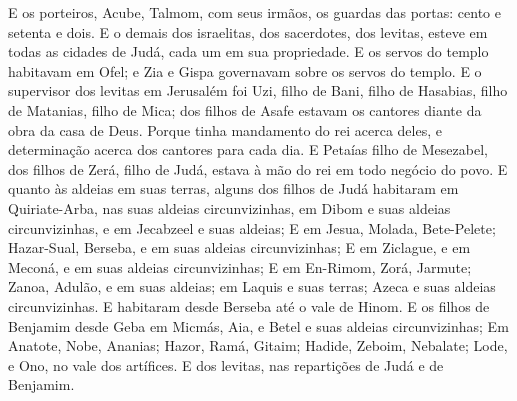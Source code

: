 {  E os porteiros, Acube, Talmom, com seus irmãos, os guardas das portas: cento e setenta e dois.
  E o demais dos israelitas, dos sacerdotes, dos levitas, esteve em todas as cidades de Judá, cada um em sua propriedade. %
  E os servos do templo habitavam em Ofel; e Zia e Gispa governavam sobre os servos do templo.
  E o supervisor dos levitas em Jerusalém foi Uzi, filho de Bani, filho de Hasabias, filho de Matanias, filho de Mica; dos filhos de Asafe estavam os cantores diante da obra da casa de Deus.
  Porque tinha mandamento do rei acerca deles, e determinação acerca dos cantores para cada dia.
  E Petaías filho de Mesezabel, dos filhos de Zerá, filho de Judá, estava à mão do rei em todo negócio do povo.
  E quanto às aldeias em suas terras, alguns dos filhos de Judá habitaram em Quiriate-Arba, nas suas aldeias circunvizinhas, em Dibom e suas aldeias circunvizinhas, e em Jecabzeel e suas aldeias;
  E em Jesua, Molada, Bete-Pelete;
  Hazar-Sual, Berseba, e em suas aldeias circunvizinhas;
  E em Ziclague, e em Meconá, e em suas aldeias circunvizinhas;
  E em En-Rimom, Zorá, Jarmute;
  Zanoa, Adulão, e em suas aldeias; em Laquis e suas terras; Azeca e suas aldeias circunvizinhas. E habitaram desde Berseba até o vale de Hinom.
  E os filhos de Benjamim desde Geba {} em Micmás, Aia, e Betel e suas aldeias circunvizinhas;
  Em Anatote, Nobe, Ananias;
  Hazor, Ramá, Gitaim;
  Hadide, Zeboim, Nebalate;
  Lode, e Ono, no vale dos artífices.
  E {} dos levitas, nas repartições de Judá e de Benjamim. %
\par }

